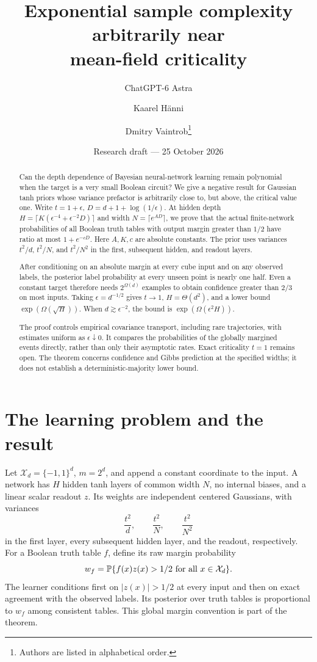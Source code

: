 \documentclass[11pt]{article}
\title{Exponential sample complexity arbitrarily near\\mean-field criticality}
\author{ChatGPT-6 Astra \and Kaarel H\"anni \and Dmitry Vaintrob\thanks{Authors are listed in alphabetical order.}}
\date{Research draft --- 25 October 2026}
\begin{document}
\maketitle
\begin{abstract}
Can the depth dependence of Bayesian neural-network learning remain polynomial when the target is a very small Boolean circuit? We give a negative result for Gaussian tanh priors whose variance prefactor is arbitrarily close to, but above, the critical value one. Write $t=1+\epsilon$, $D=d+1+\log(1/\epsilon)$. At hidden depth $H=\lceil K(\epsilon^{-4}+\epsilon^{-2}D)\rceil$ and width $N=\lceil e^{AD}\rceil$, we prove that the actual finite-network probabilities of all Boolean truth tables with output margin greater than $1/2$ have ratio at most $1+e^{-cD}$. Here $A,K,c$ are absolute constants. The prior uses variances $t^2/d$, $t^2/N$, and $t^2/N^2$ in the first, subsequent hidden, and readout layers.

After conditioning on an absolute margin at every cube input and on any observed labels, the posterior label probability at every unseen point is nearly one half. Even a constant target therefore needs $2^{\Omega(d)}$ examples to obtain confidence greater than $2/3$ on most inputs. Taking $\epsilon=d^{-1/2}$ gives $t\to1$, $H=\Theta(d^2)$, and a lower bound $\exp(\Omega(\sqrt H))$. When $d\gtrsim\epsilon^{-2}$, the bound is $\exp(\Omega(\epsilon^2H))$.

The proof controls empirical covariance transport, including rare trajectories, with estimates uniform as $\epsilon\downarrow0$. It compares the probabilities of the globally margined events directly, rather than only their asymptotic rates. Exact criticality $t=1$ remains open. The theorem concerns confidence and Gibbs prediction at the specified widths; it does not establish a deterministic-majority lower bound.
\end{abstract}
\tableofcontents

\section{The learning problem and the result}
Let $\mathcal X_d=\{-1,1\}^d$, $m=2^d$, and append a constant coordinate to the input. A network has $H$ hidden tanh layers of common width $N$, no internal biases, and a linear scalar readout $z$. Its weights are independent centered Gaussians, with variances
\begin{equation}\label{eq:prior}
 \frac{t^2}{d},\qquad \frac{t^2}{N},\qquad \frac{t^2}{N^2}
\end{equation}
in the first layer, every subsequent hidden layer, and the readout, respectively. For a Boolean truth table $f$, define its raw margin probability
\begin{equation}\label{eq:mass}
 w_f=\mathbb P\{f(x)z(x)>1/2\text{ for all }x\in\mathcal X_d\}.
\end{equation}
The learner conditions first on $|z(x)|>1/2$ at every input and then on exact agreement with the observed labels. Its posterior over truth tables is proportional to $w_f$ among consistent tables. This global margin convention is part of the theorem.
\end{document}
